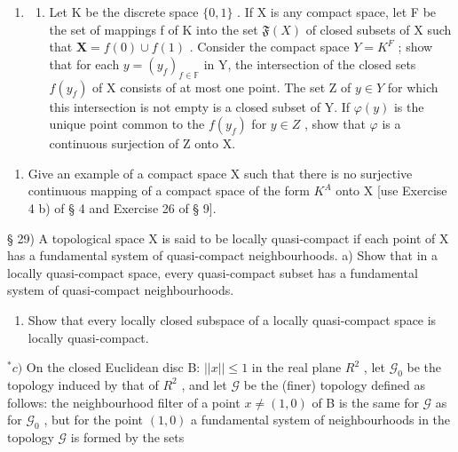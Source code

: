 \begin{enumerate}
\def\labelenumi{\arabic{enumi})}
\setcounter{enumi}{27}
\tightlist
\item
  \begin{enumerate}
  \def\labelenumii{\alph{enumii})}
  \tightlist
  \item
    Let K be the discrete space \(\{0,1\}\) . If X is any compact space, let F be the set of mappings f of K into the set \(\mathfrak{F}(X)\) of closed subsets of X such that \(\mathbf{X}=f(0)\cup f(1)\) . Consider the compact space \(Y=K^{F}\) ; show that for each \(y=(y_{f})_{f\in\mathbb{F}}\) in Y, the intersection of the closed sets \(f(y_{f})\) of X consists of at most one point. The set Z of \(y\in Y\) for which this intersection is not empty is a closed subset of Y. If \(\varphi(y)\) is the unique point common to the \(f(y_{f})\) for \(y\in Z\) , show that \(\varphi\) is a continuous surjection of Z onto X.
  \end{enumerate}
\end{enumerate}

\begin{enumerate}
\def\labelenumi{\alph{enumi})}
\setcounter{enumi}{1}
\tightlist
\item
  Give an example of a compact space X such that there is no surjective continuous mapping of a compact space of the form \(K^{A}\) onto X {[}use Exercise 4 b) of § 4 and Exercise 26 of § 9{]}.
\end{enumerate}

§ 29) A topological space X is said to be locally quasi-compact if each point of X has a fundamental system of quasi-compact neighbourhoods. a) Show that in a locally quasi-compact space, every quasi-compact subset has a fundamental system of quasi-compact neighbourhoods.

\begin{enumerate}
\def\labelenumi{\alph{enumi})}
\setcounter{enumi}{1}
\tightlist
\item
  Show that every locally closed subspace of a locally quasi-compact space is locally quasi-compact.
\end{enumerate}

\(^{*}c)\) On the closed Euclidean disc B: \(||x|| \leqslant 1\) in the real plane \(R^{2}\) , let \(\mathcal{G}_{0}\) be the topology induced by that of \(R^{2}\) , and let \(\mathcal{G}\) be the (finer) topology defined as follows: the neighbourhood filter of a point \(x \neq (1,0)\) of B is the same for \(\mathcal{G}\) as for \(\mathcal{G}_{0}\) , but for the point \((1,0)\) a fundamental system of neighbourhoods in the topology \(\mathcal{G}\) is formed by the sets

